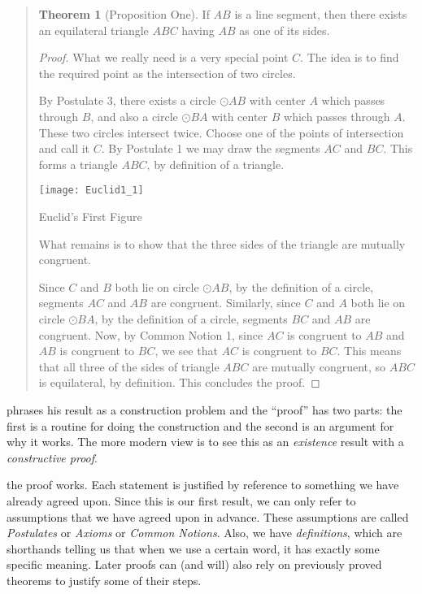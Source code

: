 \documentclass{tufte-handout}
\theoremstyle{definition}
\newtheorem*{theorem}{Theorem}
\begin{document}
\begin{quotation}
\begin{theorem}[Proposition One]
If $AB$ is a line segment, then there exists an equilateral triangle $ABC$ having $AB$ as one of its sides.
\end{theorem}

\begin{proof}
What we really need is a very special point $C$.
The idea is to find the required point as the intersection of two circles.

By Postulate 3, there exists a circle $\odot AB$ with center $A$ which passes through $B$, and also a circle $\odot BA$ with center $B$ which passes through $A$.
These two circles intersect twice.
Choose one of the points of intersection and call it $C$.
By Postulate 1 we may draw the segments $AC$ and $BC$.
This forms a triangle $ABC$, by definition of a triangle.
\begin{marginfigure}
    \texttt{[image: Euclid1\_1]}
    \caption{Euclid's First Figure}
\end{marginfigure}
What remains is to show that the three sides of the triangle are mutually congruent.

Since $C$ and $B$ both lie on circle $\odot AB$, by the definition of a circle, segments $AC$ and $AB$ are congruent.
Similarly, since $C$ and $A$ both lie on circle $\odot BA$, by the definition of a circle, segments $BC$ and $AB$ are congruent.
Now, by Common Notion 1, since $AC$ is congruent to $AB$ and $AB$ is congruent to $BC$, we see that $AC$ is congruent to $BC$.
This means that all three of the sides of triangle $ABC$ are mutually congruent, so $ABC$ is equilateral, by definition.
This concludes the proof.
\end{proof}
\end{quotation}

 phrases his result as a construction problem and the ``proof'' has two parts: the first is a routine for doing the construction and the second is an argument for why it works.
The more modern view is to see this as an \emph{existence} result with a \emph{constructive proof}.



 the proof works.
Each statement is justified by reference to something we have already agreed upon.
Since this is our first result, we can only refer to assumptions that we have agreed upon in advance.
These assumptions are called \emph{Postulates} or \emph{Axioms} or \emph{Common Notions}.
Also, we have \emph{definitions}, which are shorthands telling us that when we use a certain word, it has exactly some specific meaning.
Later proofs can (and will) also rely on previously proved theorems to justify some of their steps.
\end{document}
